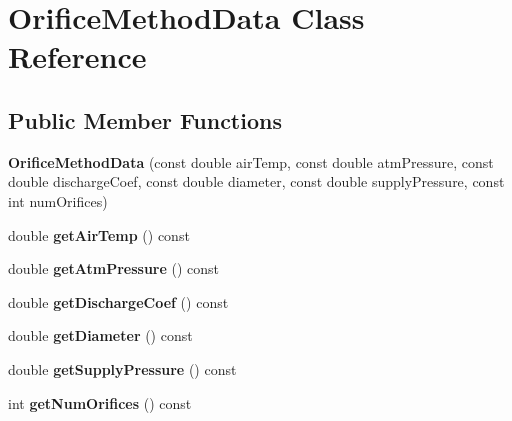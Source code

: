 \hypertarget{class_orifice_method_data}{}\section{Orifice\+Method\+Data Class Reference}
\label{class_orifice_method_data}
\subsection*{Public Member Functions}
\begin{DoxyCompactItemize}
\item 
\mbox{\label{class_orifice_method_data_aa1ae1565f565e81e4ac5ffd91c64cfd7}} 
{\bfseries Orifice\+Method\+Data} (const double air\+Temp, const double atm\+Pressure, const double discharge\+Coef, const double diameter, const double supply\+Pressure, const int num\+Orifices)
\item 
\mbox{\label{class_orifice_method_data_ad2264b0df969566c306ac99bb2de20f0}} 
double {\bfseries get\+Air\+Temp} () const
\item 
\mbox{\label{class_orifice_method_data_a71584cfb77a4f56503c58b77f131fea1}} 
double {\bfseries get\+Atm\+Pressure} () const
\item 
\mbox{\label{class_orifice_method_data_a3d55918aab47e9509924a1b5a24757b1}} 
double {\bfseries get\+Discharge\+Coef} () const
\item 
\mbox{\label{class_orifice_method_data_ac7fa3a032be60cfee2b549221bc3d42c}} 
double {\bfseries get\+Diameter} () const
\item 
\mbox{\label{class_orifice_method_data_ad62e13923b1fa76ecc52cba439e914af}} 
double {\bfseries get\+Supply\+Pressure} () const
\item 
\mbox{\label{class_orifice_method_data_a548e339ee8e96f23b6edf17438b0096b}} 
int {\bfseries get\+Num\+Orifices} () const
\item 
\mbox{\label{class_orifice_method_data_a4187943ff754f0418cd6b0e634c596d2}} 

\end{DoxyCompactItemize}
